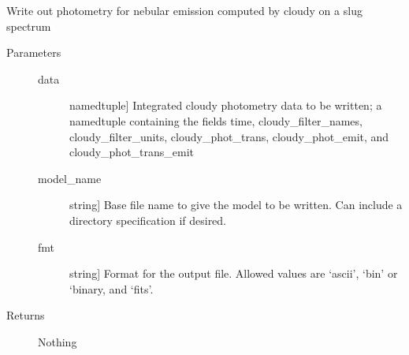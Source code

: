 \documentclass[letterpaper,10pt,english]{sphinxmanual}
\begin{document}
\begin{fulllineitems}
\label{cloudy:slugpy.cloudy.write_integrated_cloudyphot}
Write out photometry for nebular emission computed by cloudy on a
slug spectrum
\begin{description}
\item[{Parameters}] \leavevmode\begin{description}
\item[{data}] \leavevmode{[}namedtuple{]}
Integrated cloudy photometry data to be written; a namedtuple
containing the fields time, cloudy\_filter\_names, 
cloudy\_filter\_units, cloudy\_phot\_trans, cloudy\_phot\_emit,
and cloudy\_phot\_trans\_emit

\item[{model\_name}] \leavevmode{[}string{]}
Base file name to give the model to be written. Can include a
directory specification if desired.

\item[{fmt}] \leavevmode{[}string{]}
Format for the output file. Allowed values are `ascii', `bin'
or `binary, and `fits'.

\end{description}

\item[{Returns}] \leavevmode
Nothing

\end{description}

\end{fulllineitems}

\end{document}
